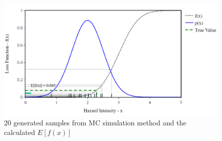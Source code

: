     \begin{figure}[H]
        \centering
        \includegraphics[scale=0.5]{Figures/Images/Illustrative Example/crude_MC_samples.png}
        \caption{20 generated samples from MC simulation method and the calculated $E[f(x)]$}
        \label{fig:crude_MC_samples}
    \end{figure}
